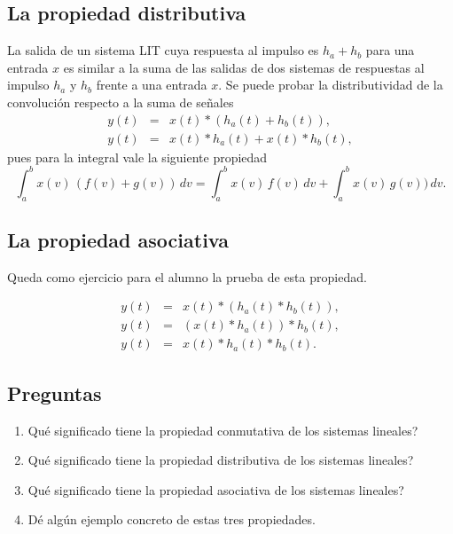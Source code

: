 \subsection{La propiedad distributiva}

La salida de un sistema LIT cuya respuesta al impulso es $h_{a} + h_{b}$ para una entrada $x$ es 
similar a la suma de las salidas de dos sistemas de respuestas al impulso $h_{a}$ y $h_{b}$ frente a una 
entrada $x$. Se puede probar la distributividad de la convoluci\'{o}n respecto a la suma de se\~{n}ales 
\begin{eqnarray}
y\left( t\right) &=&x\left( t\right) *\left( h_a\left( t\right)
+h_{b}\left( t\right) \right) , \\
y\left( t\right) &=&x\left( t\right) *h_a\left( t\right) +x\left( t\right)
*h_{b}\left( t\right),
\end{eqnarray}
pues para la integral vale la siguiente propiedad
\begin{equation}
\int_{a}^{b} x(v) \, (f(v) + g(v)) \, dv = 
\int_{a}^{b} x(v) \, f(v) \, dv + \int_{a}^{b} x(v) \, g(v)) \, dv.
\end{equation}

\subsection{La propiedad asociativa}

Queda como ejercicio para el alumno la prueba de esta propiedad.

\begin{eqnarray}
y\left( t\right) &=&x\left( t\right) *\left( h_a\left( t\right)
*h_{b}\left( t\right) \right) , \\
y\left( t\right) &=&\left( x\left( t\right) *h_a\left( t\right) \right)
*h_{b}\left( t\right) , \\
y\left( t\right) &=&x\left( t\right) *h_a\left( t\right) *h_{b}\left(
t\right) .
\end{eqnarray}

\subsection{Preguntas}

\begin{enumerate}
\item \textquestiondown Qu\'{e} significado tiene la propiedad conmutativa de los sistemas lineales?
\item \textquestiondown Qu\'{e} significado tiene la propiedad distributiva de los sistemas lineales?
\item \textquestiondown Qu\'{e} significado tiene la propiedad asociativa de los sistemas lineales?
\item D\'{e} alg\'{u}n ejemplo concreto de estas tres propiedades.
\end{enumerate}

